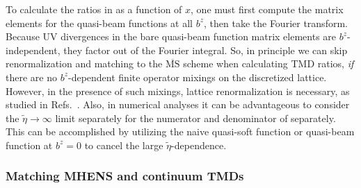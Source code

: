 \documentclass[11pt,a4paper]{article}
\newcommand{\MSbar}{{\overline{\mathrm{MS}}}}
\begin{document}
To calculate the ratios in  as a function of $x$, one must first compute the matrix elements for the quasi-beam functions at all $b^z$, then take the Fourier transform. 
Because UV divergences in the bare quasi-beam function matrix elements are $b^z$-independent, they factor out of the Fourier integral.
So, in principle we can skip renormalization and matching to the $\MSbar$ scheme when calculating TMD ratios, \emph{if} there are no $b^z$-dependent finite operator mixings on the discretized lattice. However, in the presence of such mixings, lattice renormalization is necessary, as studied in Refs.~\cite{Shanahan:2019zcq,Green:2020xco}. 
Also, in numerical analyses it can be advantageous to consider the $\tilde\eta \to\infty$ limit separately for the numerator and denominator of  separately. This can be accomplished by utilizing the naive quasi-soft function or quasi-beam function at $b^z=0$ to cancel the large $\tilde\eta$-dependence.





\subsubsection{Matching MHENS and continuum TMDs}
\label{sec:MHENS_matching}
\end{document}
